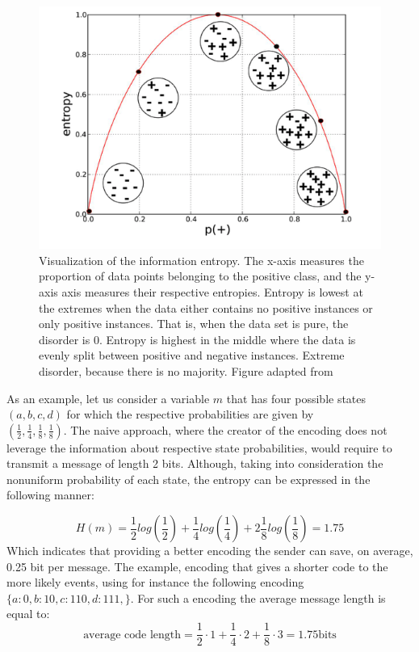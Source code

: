 \begin{figure}[h]
\centering
\includegraphics{figures/Entropy.png}
\caption{Visualization of the information entropy. The x-axis measures the proportion of data points belonging to the positive class, and the y-axis axis measures their respective entropies. Entropy is lowest at the extremes when the data either contains no positive instances or only positive instances. That is, when the data set is pure, the disorder is 0. Entropy is highest in the middle where the data is evenly split between positive and negative instances. Extreme disorder, because there is no majority. Figure adapted from \cite{DS_for_buisness}   
\label{fig:entropy}}
\end{figure}

As an example, let us consider a variable $m$ that has four possible states \\ $(a, b, c, d)$ for which the respective probabilities are given by \\ $(\frac{1}{2},\frac{1}{4},\frac{1}{8},\frac{1}{8})$.
The naive approach, where the creator of the encoding does not leverage the information about respective state probabilities, would require to transmit a message of length 2 bits. Although, taking into consideration the nonuniform probability of each state, the entropy can be expressed in the following manner: 

\begin{equation}
    H(m) = \frac{1}{2} log(\frac{1}{2}) + \frac{1}{4}  log(\frac{1}{4}) + 2 \frac{1}{8} log(\frac{1}{8}) =1.75
\end{equation}
Which indicates that providing a better encoding the sender can save, on average, 0.25 bit per message. The example, encoding that gives a shorter code to the more likely events, using for instance the following encoding $\{a:0, b:10, c:110, d:111, \}$. For such a encoding the average message length is equal to: 
\begin{equation}
\label{eq:entropy example}
    \text{average code length}= \frac{1}{2}\cdot 1 + \frac{1}{4}\cdot 2 + \frac{1}{8}\cdot 3 = 1.75 \text{bits}
\end{equation}


